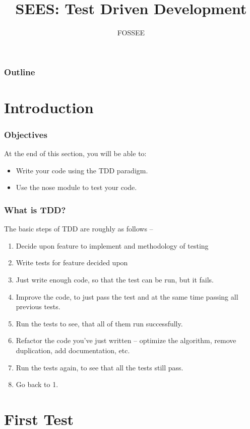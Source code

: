 \documentclass[12pt,presentation]{beamer}
\title{SEES: Test Driven Development}
\author{FOSSEE}
\begin{document}
\maketitle

\begin{frame}
\frametitle{Outline}
\setcounter{tocdepth}{3}
\tableofcontents
\end{frame}

\section{Introduction}

\begin{frame}
  \frametitle{Objectives}
  At the end of this section, you will be able to:
  \begin{itemize}
  \item Write your code using the TDD paradigm.
  \item Use the nose module to test your code.
  \end{itemize}
\end{frame}

\begin{frame}
  \frametitle{What is TDD?}
  The basic steps of TDD are roughly as follows --
  \begin{enumerate}
  \item<1-> Decide upon feature to implement and methodology of
    testing
  \item<2-> Write tests for feature decided upon
  \item<3-> Just write enough code, so that the test can be run, but it fails.
  \item<4-> Improve the code, to just pass the test and at the same time
    passing all previous tests.
  \item<5-> Run the tests to see, that all of them run successfully.
  \item<6-> Refactor the code you've just written -- optimize the algorithm,
    remove duplication, add documentation, etc.
  \item<7-> Run the tests again, to see that all the tests still pass.
  \item<8-> Go back to 1.
  \end{enumerate}
\end{frame}

\section{First Test}
\end{document}

